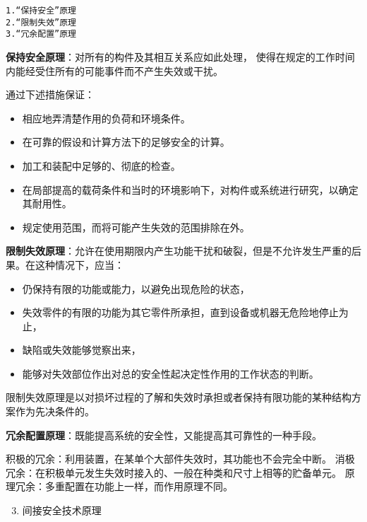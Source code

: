 \documentclass[letterpaper,10pt,english]{sphinxmanual}
\begin{document}
\begin{Verbatim}[commandchars=\\\{\}]
1.“保持安全”原理
2.“限制失效”原理
3.“冗余配置”原理
\end{Verbatim}

\textbf{保持安全原理}：对所有的构件及其相互关系应如此处理，
使得在规定的工作时间内能经受住所有的可能事件而不产生失效或干扰。

通过下述措施保证：
\begin{itemize}
\item {} 
相应地弄清楚作用的负荷和环境条件。

\item {} 
在可靠的假设和计算方法下的足够安全的计算。

\item {} 
加工和装配中足够的、彻底的检查。

\item {} 
在局部提高的载荷条件和当时的环境影响下，对构件或系统进行研究，以确定其耐用性。

\item {} 
规定使用范围，而将可能产生失效的范围排除在外。

\end{itemize}

\textbf{限制失效原理}：允许在使用期限内产生功能干扰和破裂，但是不允许发生严重的后果。在这种情况下，应当：
\begin{itemize}
\item {} 
仍保持有限的功能或能力，以避免出现危险的状态，

\item {} 
失效零件的有限的功能为其它零件所承担，直到设备或机器无危险地停止为止，

\item {} 
缺陷或失效能够觉察出来，

\item {} 
能够对失效部位作出对总的安全性起决定性作用的工作状态的判断。

\end{itemize}

限制失效原理是以对损坏过程的了解和失效时承担或者保持有限功能的某种结构方案作为先决条件的。

\textbf{冗余配置原理}：既能提高系统的安全性，又能提高其可靠性的一种手段。

积极的冗余：利用装置，在某单个大部件失效时，其功能也不会完全中断。
消极冗余：在积极单元发生失效时接入的、一般在种类和尺寸上相等的贮备单元。
原理冗余：多重配置在功能上一样，而作用原理不同。
\begin{enumerate}
\setcounter{enumi}{2}
\item {} 
间接安全技术原理

\end{enumerate}
\end{document}
